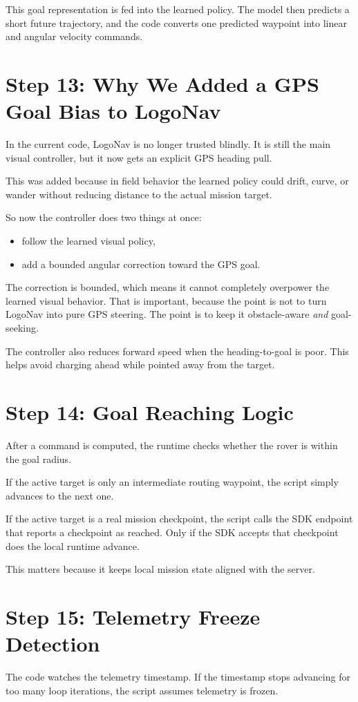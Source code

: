 \documentclass[11pt]{article}
\begin{document}
This goal representation is fed into the learned policy.
The model then predicts a short future trajectory, and the code converts one predicted waypoint into linear and angular velocity commands.

\section*{Step 13: Why We Added a GPS Goal Bias to LogoNav}
In the current code, LogoNav is no longer trusted blindly.
It is still the main visual controller, but it now gets an explicit GPS heading pull.

This was added because in field behavior the learned policy could drift, curve, or wander without reducing distance to the actual mission target.

So now the controller does two things at once:
\begin{itemize}[leftmargin=*]
\item follow the learned visual policy,
\item add a bounded angular correction toward the GPS goal.
\end{itemize}

The correction is bounded, which means it cannot completely overpower the learned visual behavior.
That is important, because the point is not to turn LogoNav into pure GPS steering.
The point is to keep it obstacle-aware \emph{and} goal-seeking.

The controller also reduces forward speed when the heading-to-goal is poor.
This helps avoid charging ahead while pointed away from the target.

\section*{Step 14: Goal Reaching Logic}
After a command is computed, the runtime checks whether the rover is within the goal radius.

If the active target is only an intermediate routing waypoint, the script simply advances to the next one.

If the active target is a real mission checkpoint, the script calls the SDK endpoint that reports a checkpoint as reached.
Only if the SDK accepts that checkpoint does the local runtime advance.

This matters because it keeps local mission state aligned with the server.

\section*{Step 15: Telemetry Freeze Detection}
The code watches the telemetry timestamp.
If the timestamp stops advancing for too many loop iterations, the script assumes telemetry is frozen.
\end{document}
